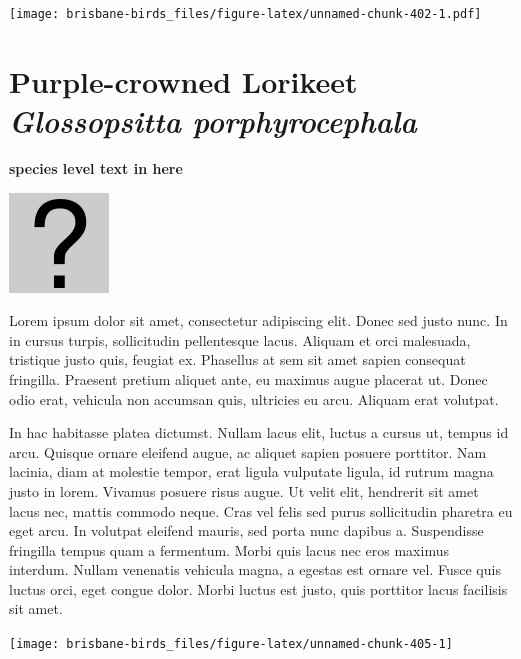 \documentclass[]{book}
\let\origfigure\figure
\let\endorigfigure\endfigure
\renewenvironment{figure}[1][2] {
  \expandafter\origfigure\expandafter[H]
} {
  \endorigfigure
}
\begin{document}
\begin{figure}
\centering
\texttt{[image: brisbane-birds\_files/figure-latex/unnamed-chunk-402-1.pdf]}
\caption{\label{fig:unnamed-chunk-402}insert figure caption}
\end{figure}

\section{\texorpdfstring{Purple-crowned Lorikeet \emph{Glossopsitta
porphyrocephala}}{Purple-crowned Lorikeet Glossopsitta porphyrocephala}}\label{purple-crowned-lorikeet-glossopsitta-porphyrocephala}

\textbf{species level text in here}

\begin{figure}
\centering
\includegraphics{assets/missing.png}
\caption{No image for species}
\end{figure}

Lorem ipsum dolor sit amet, consectetur adipiscing elit. Donec sed justo
nunc. In in cursus turpis, sollicitudin pellentesque lacus. Aliquam et
orci malesuada, tristique justo quis, feugiat ex. Phasellus at sem sit
amet sapien consequat fringilla. Praesent pretium aliquet ante, eu
maximus augue placerat ut. Donec odio erat, vehicula non accumsan quis,
ultricies eu arcu. Aliquam erat volutpat.

In hac habitasse platea dictumst. Nullam lacus elit, luctus a cursus ut,
tempus id arcu. Quisque ornare eleifend augue, ac aliquet sapien posuere
porttitor. Nam lacinia, diam at molestie tempor, erat ligula vulputate
ligula, id rutrum magna justo in lorem. Vivamus posuere risus augue. Ut
velit elit, hendrerit sit amet lacus nec, mattis commodo neque. Cras vel
felis sed purus sollicitudin pharetra eu eget arcu. In volutpat eleifend
mauris, sed porta nunc dapibus a. Suspendisse fringilla tempus quam a
fermentum. Morbi quis lacus nec eros maximus interdum. Nullam venenatis
vehicula magna, a egestas est ornare vel. Fusce quis luctus orci, eget
congue dolor. Morbi luctus est justo, quis porttitor lacus facilisis sit
amet.

\begin{figure}
\texttt{[image: brisbane-birds\_files/figure-latex/unnamed-chunk-405-1]} \caption{insert figure caption}\label{fig:unnamed-chunk-405}
\end{figure}
\end{document}
